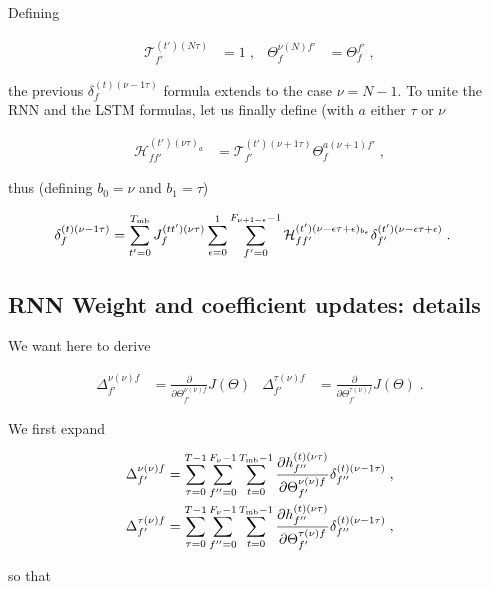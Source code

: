 \begin{subappendices}
Defining 

\begin{align}
\mathcal{T}^{(t')(N\tau)}_{f'}&=1\;,&
%
\Theta^{\nu(N)f'}_{f}&=\Theta^{f'}_{f}\;,
\end{align}

the previous $ \delta^{(t)(\nu-1\tau)}_f$ formula extends to the case $\nu  =N-1$. To unite the RNN and the LSTM formulas, let us finally define (with $a$ either $\tau$ or $\nu$

\begin{align}
\mathcal{H}^{(t')(\nu\tau)_a}_{ff'}&=\mathcal{T}^{(t')(\nu+1\tau)}_{f'}\Theta^{a(\nu+1)f'}_{f}\;,
\end{align}

thus (defining $b_0=\nu$ and $b_1=\tau$)

\begin{align}
\delta^{(t)(\nu-1\tau)}_f&= 
%
\sum_{t'=0}^{T_{{\rm mb}}}J^{(tt')(\nu\tau)}_f\sum_{\epsilon=0}^{1}\sum_{f'=0}^{F_{\nu+1-\epsilon}-1}
%
\mathcal{H}^{(t')(\nu-\epsilon\tau+\epsilon)_{b_\epsilon}}_{ff'}\delta^{(t')(\nu-\epsilon\tau+\epsilon)}_{f'}\;.
\end{align}


\subsection{RNN Weight and coefficient updates: details} \label{sec:rnncoefficient}

We want here to derive 

\begin{align}
\Delta^{\nu(\nu)f}_{f'}&=\frac{\partial}{\partial \Theta^{\nu(\nu)f}_{f'}} J(\Theta)&
%
\Delta^{\tau(\nu)f}_{f'}&=\frac{\partial}{\partial \Theta^{\tau(\nu)f}_{f'}} J(\Theta)\;.
\end{align}

We first expand

\begin{align}
\Delta^{\nu(\nu)f}_{f'}&=\sum_{\tau=0}^{T-1}\sum_{f''=0}^{F_\nu-1}\sum_{t=0}^{T_{{\rm mb}}-1}
%
\frac{\partial h^{(t)(\nu\tau)}_{f''}}{\partial \Theta^{\nu(\nu)f}_{f'}}
%
\delta^{(t)(\nu-1\tau)}_{f''}\;,\notag\\
%
\Delta^{\tau(\nu)f}_{f'}&=\sum_{\tau=0}^{T-1}\sum_{f''=0}^{F_\nu-1}\sum_{t=0}^{T_{{\rm mb}}-1}
%
\frac{\partial h^{(t)(\nu\tau)}_{f''}}{\partial \Theta^{\tau(\nu)f}_{f'}}
%
\delta^{(t)(\nu-1\tau)}_{f''}\;,
\end{align}

so that


\end{subappendices}
